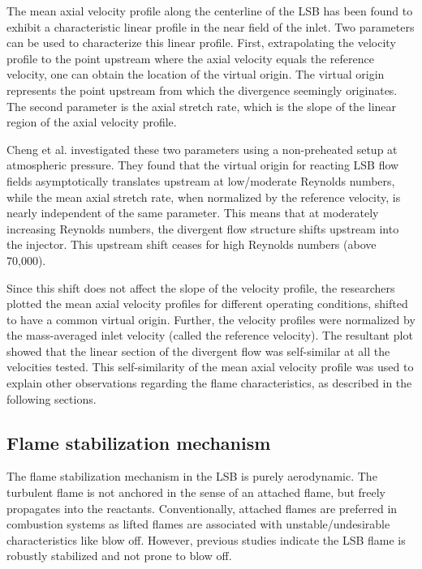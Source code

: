 The mean axial velocity profile along the centerline of the LSB has been found\cite{2006-cheng,2008-cheng-a} to exhibit a characteristic linear profile in the near field of the inlet.
Two parameters can be used to characterize this linear profile.
First, extrapolating the velocity profile to the point upstream where the axial velocity equals the reference velocity, one can obtain the location of the virtual origin.
The virtual origin represents the point upstream from which the divergence seemingly originates.
The second parameter is the axial stretch rate, which is the slope of the linear region of the axial velocity profile.

Cheng et al.\cite{2006-cheng,2008-cheng-a} investigated these two parameters using a non-preheated setup at atmospheric pressure.
They found that the virtual origin for reacting LSB flow fields asymptotically translates upstream at low/moderate Reynolds numbers, while the mean axial stretch rate, when normalized by the reference velocity, is nearly independent of the same parameter.
This means that at moderately increasing Reynolds numbers, the divergent flow structure shifts upstream into the injector.
This upstream shift ceases for high Reynolds numbers (above 70,000).

Since this shift does not affect the slope of the velocity profile, the researchers plotted the mean axial velocity profiles for different operating conditions, shifted to have a common virtual origin.
Further, the velocity profiles were normalized by the mass-averaged inlet velocity (called the reference velocity).
The resultant plot showed that the linear section of the divergent flow was self-similar at all the velocities tested.
This self-similarity of the mean axial velocity profile was used to explain other observations regarding the flame characteristics, as described in the following sections.

\subsection{Flame stabilization mechanism}
\label{subsec:lsb-flame-stabilization-mechanism}

The flame stabilization mechanism in the LSB is purely aerodynamic.
The turbulent flame is not anchored in the sense of an attached flame, but freely propagates into the reactants.
Conventionally, attached flames are preferred in combustion systems as lifted flames are associated with unstable/undesirable characteristics like blow off.
However, previous studies\cite{2005-johnson} indicate the LSB flame is robustly stabilized and not prone to blow off.

